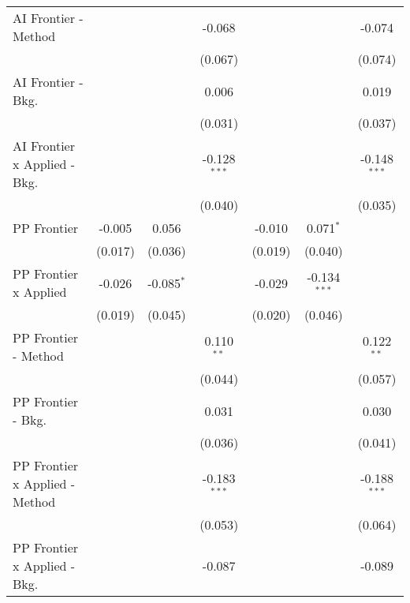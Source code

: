\begin{tabular}{lcccccc}
   AI Frontier - Method           &         &              & -0.068         &         &                & -0.074\\   
                                  &         &              & (0.067)        &         &                & (0.074)\\   
   AI Frontier - Bkg.             &         &              & 0.006          &         &                & 0.019\\   
                                  &         &              & (0.031)        &         &                & (0.037)\\   
   AI Frontier x Applied - Bkg.   &         &              & -0.128$^{***}$ &         &                & -0.148$^{***}$\\   
                                  &         &              & (0.040)        &         &                & (0.035)\\   
   PP Frontier                    & -0.005  & 0.056        &                & -0.010  & 0.071$^{*}$    &   \\   
                                  & (0.017) & (0.036)      &                & (0.019) & (0.040)        &   \\   
   PP Frontier x Applied          & -0.026  & -0.085$^{*}$ &                & -0.029  & -0.134$^{***}$ &   \\   
                                  & (0.019) & (0.045)      &                & (0.020) & (0.046)        &   \\   
   PP Frontier - Method           &         &              & 0.110$^{**}$   &         &                & 0.122$^{**}$\\   
                                  &         &              & (0.044)        &         &                & (0.057)\\   
   PP Frontier - Bkg.             &         &              & 0.031          &         &                & 0.030\\   
                                  &         &              & (0.036)        &         &                & (0.041)\\   
   PP Frontier x Applied - Method &         &              & -0.183$^{***}$ &         &                & -0.188$^{***}$\\   
                                  &         &              & (0.053)        &         &                & (0.064)\\   
   PP Frontier x Applied - Bkg.   &         &              & -0.087         &         &                & -0.089\\   

\end{tabular}
